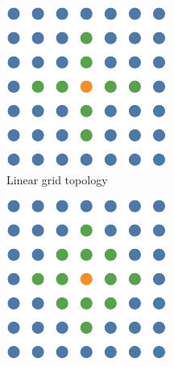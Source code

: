\begin{figure}[b]
    \begin{subfigure}[t]{0.3\textwidth}
        \includegraphics[width=\textwidth]{img/master_neigh_linear.pdf}
        \caption{Linear grid topology}
        \label{fig:topologygridlinear}
    \end{subfigure}
    \hfill
    \begin{subfigure}[t]{0.3\textwidth}
        \includegraphics[width=\textwidth]{img/master_neigh_diamond.pdf}

\end{subfigure}
\end{figure}
